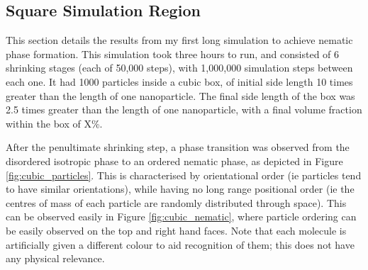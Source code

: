 \documentclass[11pt, a4paper]{article} %
\begin{document}
\subsection{Square Simulation Region}
This section details the results from my first long simulation to achieve nematic phase formation. This simulation took three hours to run, and consisted of 6 shrinking stages (each of 50,000 steps), with 1,000,000 simulation steps between each one. It had 1000 particles inside a cubic box, of initial side length 10 times greater than the length of one nanoparticle. The final side length of the box was 2.5 times greater than the length of one nanoparticle, with a final volume fraction within the box of X\%.%

After the penultimate shrinking step, a phase transition was observed from the disordered isotropic phase to an ordered nematic phase, as depicted in Figure \ref{fig:cubic_particles}. This is characterised by orientational order (ie particles tend to have similar orientations), while having no long range positional order (ie the centres of mass of each particle are randomly distributed through space). This can be observed easily in Figure \ref{fig:cubic_nematic}, where particle ordering can be easily observed on the top and right hand faces. Note that each molecule is artificially given a different colour to aid recognition of them; this does not have any physical relevance.
\end{document}
